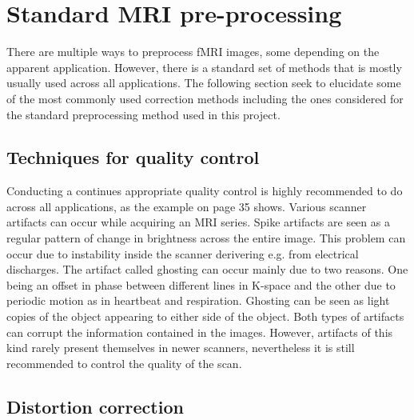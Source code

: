 \section{Standard MRI pre-processing}
There are multiple ways to preprocess fMRI images, some depending on the apparent application. However, there is a standard set of methods that is mostly usually used across all applications. The following section seek to elucidate some of the most commonly used correction methods including the ones considered for the standard preprocessing method used in this project. 

\subsection{Techniques for quality control}
Conducting a continues appropriate quality control is highly recommended to do across all applications, as the example on \figref page 35 shows. Various scanner artifacts can occur while acquiring an MRI series. Spike artifacts are seen as a regular pattern of change in brightness across the entire image. This problem can occur due to instability inside the scanner derivering e.g. from electrical discharges.  
The artifact called ghosting can occur mainly due to two reasons. One being an offset in phase between different lines in K-space and the other due to periodic motion as in heartbeat and respiration. Ghosting can be seen as light copies of the object appearing to either side of the object. Both types of artifacts can corrupt the information contained in the images. However, artifacts of this kind rarely present themselves in newer scanners, nevertheless it is still recommended to control the quality of the scan. \cite{Handbook}

\subsection{Distortion correction}

